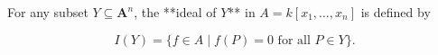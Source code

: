 For any subset $Y \subseteq \mathbf{A}^n$, the **ideal of $Y$** in $A = k[x_1, \ldots, x_n]$ is defined by

$$I(Y) = \{ f \in A \mid f(P) = 0 \text{ for all } P \in Y \}.$$
